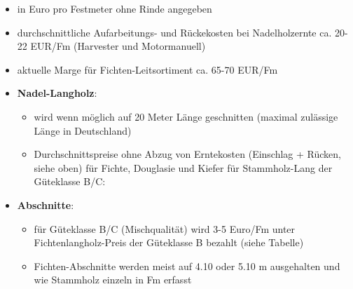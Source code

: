 \documentclass{article}
\begin{document}
\begin{itemize} 

\item in Euro pro Festmeter ohne Rinde angegeben

\item durchschnittliche Aufarbeitungs- und Rückekosten bei Nadelholzernte ca. 20-22 EUR/Fm (Harvester und Motormanuell)

\item aktuelle Marge für Fichten-Leitsortiment ca. 65-70 EUR/Fm

\item \textbf{Nadel-Langholz}: 

    \begin{itemize} 
    	
    	\item wird wenn möglich auf 20 Meter Länge geschnitten (maximal zulässige Länge in Deutschland)
    	
    	\item Durchschnittspreise ohne Abzug von Erntekosten (Einschlag + Rücken, siehe oben) für Fichte, Douglasie und Kiefer für Stammholz-Lang der Güteklasse B/C:

		\begin{figure}[htb]
			\centering
		\end{figure}

   \end{itemize} 

\item \textbf{Abschnitte}:

        \begin{itemize} 
        	
        	\item für Güteklasse B/C (Mischqualität) wird 3-5 Euro/Fm unter Fichtenlangholz-Preis der Güteklasse B bezahlt (siehe Tabelle)
 
            \item Fichten-Abschnitte werden meist auf 4.10 oder 5.10 m ausgehalten und wie Stammholz einzeln in Fm erfasst 
            

\end{itemize}
\end{itemize}
\end{document}
